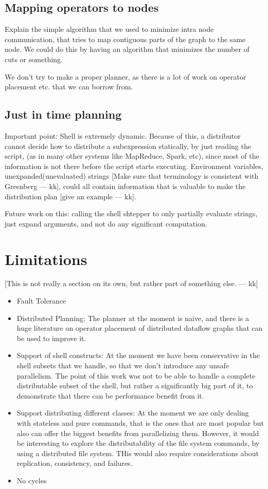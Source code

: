 \documentclass[sigplan,10pt,review,anonymous]{acmart}
\newcommand{\kk}[1]{[{\color{magenta}#1 --- kk}]}
\begin{document}
\subsection{Mapping operators to nodes}

Explain the simple algorithm that we used to minimize intra node
communication, that tries to map contiguous parts of the graph to the
same node. We could do this by having an algorithm that minimizes the
number of cuts or something.

We don't try to make a proper planner, as there is a lot of work on
operator placement etc. that we can borrow from.


\subsection{Just in time planning}

Important point: Shell is extremely dynamic. Because of this, a
distributor cannot decide how to distribute a subexpression
statically, by just reading the script, (as in many other systems like
MapReduce, Spark, etc), since most of the information is not there
before the script starts executing. Environment variables,
unexpanded(unevaluated) strings \kk{Make sure that terminology is
  consistent with Greenberg}, could all contain information that is
valuable to make the distribution plan \kk{give an example}.


Future work on this: calling the shell shtepper to only partially
evaluate strings, just expand arguments, and not do any significant
computation.


\section{Limitations}

\kk{This is not really a section on its own, but rather part of something else.}

\begin{itemize}
\item Fault Tolerance
\item Distributed Planning: The planner at the moment is naive, and
  there is a huge literature on operator placement of distributed
  dataflow graphs that can be used to improve it.
\item Support of shell constructs: At the moment we have been
  conservative in the shell subsets that we handle, so that we don't
  introduce any unsafe parallelism. The point of this work was not to
  be able to handle a complete distributable subset of the shell, but
  rather a significantly big part of it, to demonstrate that there can
  be performance benefit from it.
\item Support distributing different classes: At the moment we are
  only dealing with stateless and pure commands, that is the ones that
  are most popular but also can offer the biggest benefits from
  parallelizing them. However, it would be interesting to explore the
  distributability of the file system commands, by using a distributed
  file system. THis would also require considerations about
  replication, consistency, and failures.
\item No cycles
\end{itemize}
\end{document}
